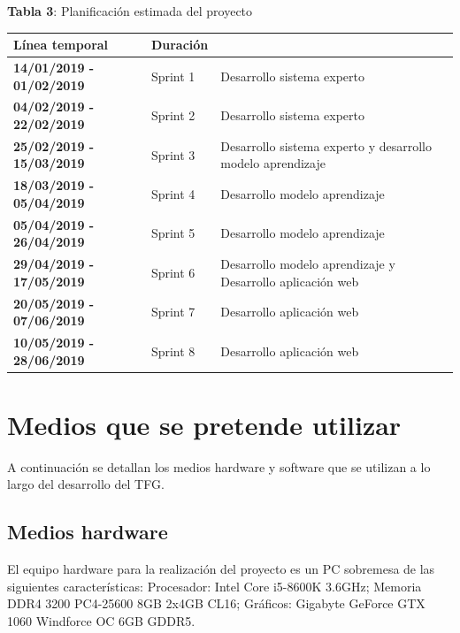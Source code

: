 \documentclass[11pt,a4paper,twoside,final]{article}
\begin{document}
\begin{center}
   \textbf{Tabla 3}: Planificación estimada del proyecto\\[1em]
   \begin{tabular}{p{} p{} p{}}
        \hline
		\textbf{Línea temporal} & \textbf{Duración}  & \text{Temática}\\
		\hline
		    \textbf{14/01/2019 - 01/02/2019} & Sprint 1 & Desarrollo sistema experto\\
		    \textbf{04/02/2019 - 22/02/2019} & Sprint 2 & Desarrollo sistema experto \\
		    \textbf{25/02/2019 - 15/03/2019} & Sprint 3 & Desarrollo sistema experto y desarrollo modelo aprendizaje\\
		    \textbf{18/03/2019 - 05/04/2019} & Sprint 4 & Desarrollo modelo aprendizaje\\
		    \textbf{05/04/2019 - 26/04/2019} & Sprint 5 & Desarrollo modelo aprendizaje\\
		    \textbf{29/04/2019 - 17/05/2019} & Sprint 6 & Desarrollo modelo aprendizaje y Desarrollo aplicación web\\
		    \textbf{20/05/2019 - 07/06/2019} & Sprint 7 & Desarrollo aplicación web\\
		    \textbf{10/05/2019 - 28/06/2019} & Sprint 8 & Desarrollo aplicación web\\
		\hline
   \end{tabular}
\end{center}


\newpage
\section{Medios que se pretende utilizar}
A continuación se detallan los medios hardware y software que se utilizan a lo largo del desarrollo del TFG.

\subsection{Medios hardware}
El equipo hardware para la realización del proyecto es un PC sobremesa de las siguientes características: Procesador: Intel Core i5-8600K 3.6GHz; Memoria DDR4 3200 PC4-25600 8GB 2x4GB CL16; Gráficos: Gigabyte GeForce GTX 1060 Windforce OC 6GB GDDR5.
\end{document}
